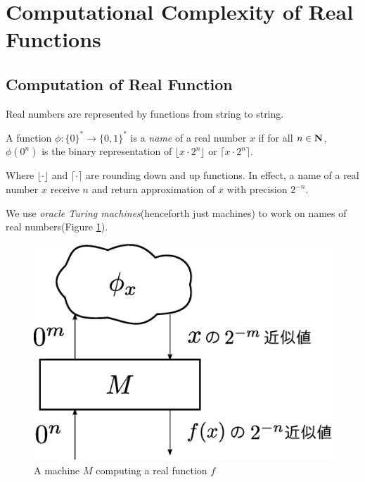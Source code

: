 \section{Computational Complexity of Real Functions}
\label{section: preliminaries}

\subsection{Computation of Real Function}

Real numbers are represented by functions from string to string.
\begin{definition}
 A function $\phi \colon \{0\} ^* \to \{0, 1\}^*$ is a \emph{name} of a real number $x$ 
 if for all $n \in \mathbf N$,
  $\phi(0^n)$ is the binary representation of $\lfloor x \cdot 2^n \rfloor$ or
  $\lceil x \cdot 2^n \rceil$.
 \end{definition}
Where $\lfloor \cdot \rfloor$ and $\lceil \cdot \rceil$ are 
rounding down and up functions.
In effect, a name of a real number $x$ receive $n$ and return approximation of $x$ with precision $2^{-n}$.

We use \emph{oracle Turing machines}(henceforth just machines)
to work on names of real numbers(Figure \ref{fig:model-of-function}).

 \begin{figure}
  \begin{center}
   \includegraphics[height=0.15\textheight]{image/model-of-function.eps}
  \end{center}
  \caption{A machine $M$ computing a real function $f$}
  \label{fig:model-of-function}
 \end{figure}

